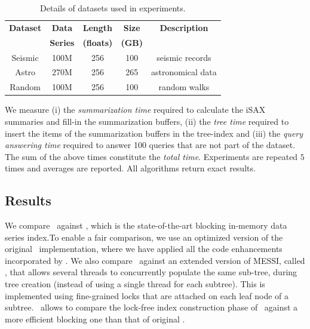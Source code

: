 \begin{table}[htbp]
    \centering
    \renewcommand{\arraystretch}{1.2} %
    \begin{tabular}{||c | c | c | c | c||} 
        \hline
        \textbf{Dataset} & \textbf{Data} & \textbf{Length} & \textbf{Size} & \textbf{Description}  \\ 
        & \textbf{Series} & \textbf{(floats)} & \textbf{(GB)} & \\ [0.5ex]
        \hline\hline
        Seismic & 100M & 256 & 100 & seismic records  \\ 
        \hline
        Astro & 270M & 256 & 265 & astronomical data \\ 
        \hline
        Random & 100M & 256 & 100 & random walks  \\ 
        \hline
    \end{tabular}
    \caption{Details of datasets used in experiments.}
    \label{table:datasets}
\end{table}
\clearpage
{}
% 
We measure (i) the {\em summarization time} required to calculate
the iSAX summaries and fill-in the summarization buffers, 
(ii) the {\em tree time} required to insert the items of the summarization buffers in the
tree-index and (iii) the {\em query answering time} required to answer 100 queries
that are not part of the dataset. 
The  sum of the above times constitute the {\em total time}.
Experiments are repeated $5$ times and averages are reported.
All algorithms return exact results.

\subsection{Results}

We compare \Fresh\ against \MESSI, which is the state-of-the-art blocking
in-memory data series index.To enable a fair comparison, we use an 
optimized version of the original \MESSI\ implementation,
where we have applied all the code enhancements incorporated by \Fresh.
% 
We also compare \Fresh\ against an extended version of MESSI, called \MESSIenh
, that allows several threads to concurrently populate the same sub-tree, 
during tree creation (instead of using a single thread for each subtree).
This is implemented using fine-grained locks that are attached on each leaf
node of a subtree.
\MESSIenh\ allows to compare the lock-free index construction phase of \Fresh\ against
a more efficient blocking one than that of original \MESSI.


